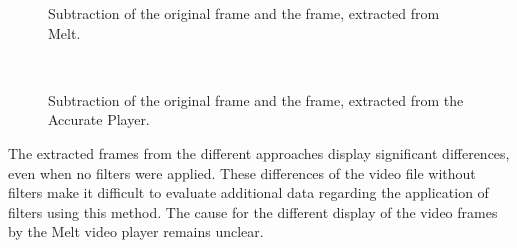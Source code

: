 \documentclass[../MasterThesis.tex]{subfiles}
\begin{document}
\begin{minipage}{0.48\textwidth}
	\begin{figure}[H]
		\begin{center}
			\caption[Subtraction of the two frames (original video and Melt).]{Subtraction of the original frame and the frame, extracted from Melt.}
			\label{figure:oVSmelt}
		\end{center}
	\end{figure}
\end{minipage}\begin{minipage}{0.04\textwidth}
	\ 
\end{minipage}\begin{minipage}{0.48\textwidth}
	\begin{figure}[H]
		\begin{center}
			\caption[Subtraction of the two frames (original video and Accurate Player).]{Subtraction of the original frame and the frame, extracted from the Accurate Player.}
			\label{figure:oVSap}
		\end{center}
	\end{figure}
\end{minipage}









\vspace*{2em}
The extracted frames from the different approaches display significant differences, even when no filters were applied. 
These differences of the video file without filters make it difficult to evaluate additional data regarding the application of filters using this method. The cause for the different display of the video frames by the Melt video player remains unclear. 
\end{document}
